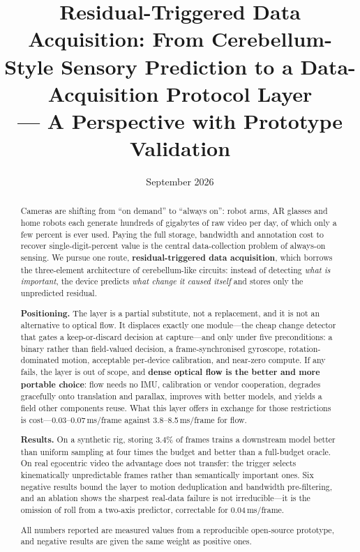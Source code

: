 \documentclass[12pt,a4paper]{article}
\title{Residual-Triggered Data Acquisition: From Cerebellum-Style Sensory Prediction to a Data-Acquisition Protocol Layer\\[4pt]
\large --- A Perspective with Prototype Validation}
\author{}
\date{September 2026}
\begin{document}
\maketitle

\begin{abstract}
Cameras are shifting from ``on demand'' to ``always on'': robot arms, AR glasses and home robots each generate hundreds of gigabytes of raw video per day, of which only a few percent is ever used. Paying the full storage, bandwidth and annotation cost to recover single-digit-percent value is the central data-collection problem of always-on sensing. We pursue one route, \textbf{residual-triggered data acquisition}, which borrows the three-element architecture of cerebellum-like circuits: instead of detecting \emph{what is important}, the device predicts \emph{what change it caused itself} and stores only the unpredicted residual.

\textbf{Positioning.} The layer is a partial substitute, not a replacement, and it is not an alternative to optical flow. It displaces exactly one module---the cheap change detector that gates a keep-or-discard decision at capture---and only under five preconditions: a binary rather than field-valued decision, a frame-synchronised gyroscope, rotation-dominated motion, acceptable per-device calibration, and near-zero compute. If any fails, the layer is out of scope, and \textbf{dense optical flow is the better and more portable choice}: flow needs no IMU, calibration or vendor cooperation, degrades gracefully onto translation and parallax, improves with better models, and yields a field other components reuse. What this layer offers in exchange for those restrictions is cost---0.03--0.07\,ms/frame against 3.8--8.5\,ms/frame for flow.

\textbf{Results.} On a synthetic rig, storing 3.4\% of frames trains a downstream model better than uniform sampling at four times the budget and better than a full-budget oracle. On real egocentric video the advantage does not transfer: the trigger selects kinematically unpredictable frames rather than semantically important ones. Six negative results bound the layer to motion deduplication and bandwidth pre-filtering, and an ablation shows the sharpest real-data failure is not irreducible---it is the omission of roll from a two-axis predictor, correctable for 0.04\,ms/frame.

All numbers reported are measured values from a reproducible open-source prototype, and negative results are given the same weight as positive ones.
\end{abstract}
\end{document}
